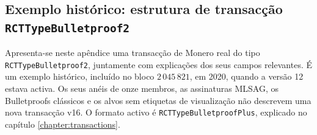 \begin{appendices}

\renewcommand{\theFancyVerbLine}{%
  \textcolor{black!65}{\scriptsize\sffamily\arabic{FancyVerbLine}}}

\chapter{Exemplo histórico: estrutura de transacção
{\tt RCTTypeBulletproof2}}
\label{appendix:RCTTypeBulletproof2}

Apresenta-se neste apêndice uma transacção de Monero real do tipo
{\tt RCTTypeBulletproof2}, juntamente com explicações dos seus campos
relevantes. É um exemplo histórico, incluído no bloco \(2\,045\,821\), em
2020, quando a versão 12 estava activa. Os seus anéis de onze membros, as
assinaturas MLSAG, os Bulletproofs clássicos e os alvos sem etiquetas de
visualização não descrevem uma nova transacção v16. O formato activo é
{\tt RCTTypeBulletproofPlus}, explicado no capítulo
\ref{chapter:transactions}.


\end{appendices}
